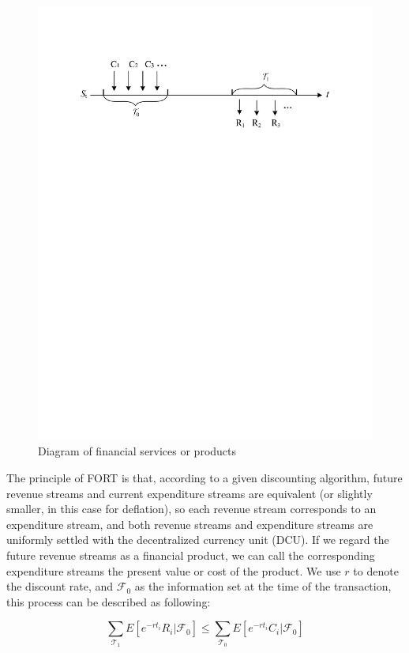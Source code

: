 \documentclass[letterpaper,12pt]{article}
\begin{document}
\begin{figure}[h]
\centering
\includegraphics[width=4.5in]{fig-1}
\caption{Diagram of financial services or products}
\end{figure}

The principle of FORT is that, according to a given discounting algorithm, future revenue streams and current expenditure streams are equivalent (or slightly smaller, in this case for deflation), so each revenue stream corresponds to an expenditure stream, and both revenue streams and expenditure streams are uniformly settled with the decentralized currency unit (DCU). 
If we regard the future revenue streams as a financial product, we can call the corresponding expenditure streams the present value or cost of the product. 
We use $r$ to denote the discount rate, and $\mathcal{F}_0$  as the information set at the time of the transaction, this process can be described as following:

\begin{equation}
\sum_{\mathcal{T}_1} E\left[e^{-rt_{i}}R_{i}|\mathcal{F}_0\right] \leq \sum_{\mathcal{T}_0} E\left[e^{-rt_{i}}C_{i}|\mathcal{F}_0\right] 
\label{e1}
\end{equation}
\end{document}

